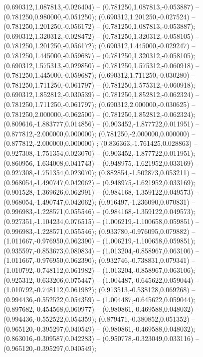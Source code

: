 (0.690312,1.087813,-0.026404) -- (0.781250,1.087813,-0.053887) -- (0.781250,0.980000,-0.051250);
 (0.690312,1.201250,-0.027524) -- (0.781250,1.201250,-0.056172) -- (0.781250,1.087813,-0.053887);
 (0.690312,1.320312,-0.028472) -- (0.781250,1.320312,-0.058105) -- (0.781250,1.201250,-0.056172);
 (0.690312,1.445000,-0.029247) -- (0.781250,1.445000,-0.059687) -- (0.781250,1.320312,-0.058105);
 (0.690312,1.575313,-0.029850) -- (0.781250,1.575312,-0.060918) -- (0.781250,1.445000,-0.059687);
 (0.690312,1.711250,-0.030280) -- (0.781250,1.711250,-0.061797) -- (0.781250,1.575312,-0.060918);
 (0.690312,1.852812,-0.030539) -- (0.781250,1.852812,-0.062324) -- (0.781250,1.711250,-0.061797);
 (0.690312,2.000000,-0.030625) -- (0.781250,2.000000,-0.062500) -- (0.781250,1.852812,-0.062324);
 (0.809616,-1.883777,0.014856) -- (0.903452,-1.877722,0.011951) -- (0.877812,-2.000000,0.000000);
 (0.781250,-2.000000,0.000000) -- (0.877812,-2.000000,0.000000) ;
 (0.836363,-1.761425,0.028863) -- (0.927308,-1.751354,0.023070) -- (0.903452,-1.877722,0.011951);
 (0.860956,-1.634008,0.041743) -- (0.948975,-1.621952,0.033169) -- (0.927308,-1.751354,0.023070);
 (0.882854,-1.502873,0.053211) -- (0.968054,-1.490747,0.042062) -- (0.948975,-1.621952,0.033169);
 (0.901528,-1.369626,0.062991) -- (0.984168,-1.359122,0.049573) -- (0.968054,-1.490747,0.042062);
 (0.916497,-1.236090,0.070831) -- (0.996983,-1.228571,0.055546) -- (0.984168,-1.359122,0.049573);
 (0.927351,-1.104234,0.076515) -- (1.006219,-1.100658,0.059851) -- (0.996983,-1.228571,0.055546);
 (0.933780,-0.976095,0.079882) -- (1.011667,-0.976950,0.062390) -- (1.006219,-1.100658,0.059851);
 (0.935597,-0.853673,0.080834) -- (1.013204,-0.858967,0.063106) -- (1.011667,-0.976950,0.062390);
 (0.932746,-0.738831,0.079341) -- (1.010792,-0.748112,0.061982) -- (1.013204,-0.858967,0.063106);
 (0.925312,-0.633206,0.075447) -- (1.004487,-0.645622,0.059044) -- (1.010792,-0.748112,0.061982);
 (0.913513,-0.538128,0.069268) -- (0.994436,-0.552522,0.054359) -- (1.004487,-0.645622,0.059044);
 (0.897682,-0.454568,0.060977) -- (0.980861,-0.469588,0.048032) -- (0.994436,-0.552522,0.054359);
 (0.879471,-0.380852,0.051352) -- (0.965120,-0.395297,0.040549) -- (0.980861,-0.469588,0.048032);
 (0.863016,-0.309587,0.042283) -- (0.950778,-0.323049,0.033116) -- (0.965120,-0.395297,0.040549);
